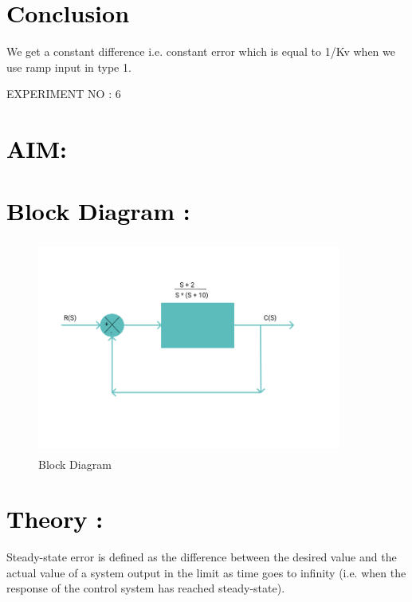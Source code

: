 \documentclass[12pt]{article}
\begin{document}
\section*{\textcolor{black}{Conclusion}}
We get a constant difference i.e. constant error which is equal to 1/Kv when we use ramp input in type 1.
 \pagebreak
 
 \begin{center}
    \LARGE {EXPERIMENT NO : 6}
             
\end{center}

\section*{\textcolor{black}{AIM: }}

\section*{\textcolor{black}{Block Diagram :}}

\begin{figure}[!hth]
        \centering
        \includegraphics[width =10cm, height = 7cm]{images/exp6.png}
        \caption{Block Diagram}
        \label{Graph}
\end{figure}

\section*{\textcolor{black}{Theory :}}
Steady-state error is defined as the difference between the desired value and the actual value of a system output in the limit as time goes to infinity (i.e. when the response of the control system has reached steady-state).\par
\end{document}
